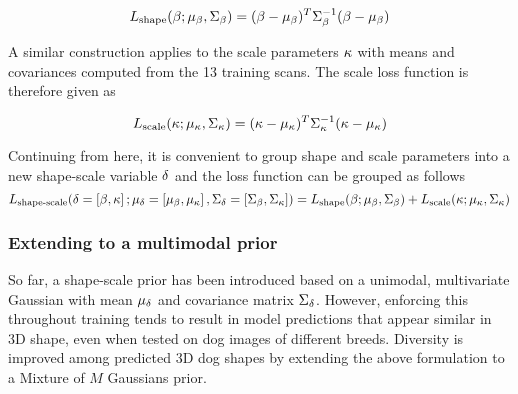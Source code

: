 \begin{equation}
    L_{\textrm{shape}}(\beta;\mu_{\beta},\Sigma_{\beta}) = (\beta - \mu_{\beta})^{T}\Sigma_{\beta}^{-1}(\beta - \mu_{\beta})
\end{equation}

A similar construction applies to the scale parameters $\kappa$ with means and covariances computed from the 13 training scans. The scale loss function is therefore given as

\begin{equation}
    L_{\textrm{scale}}(\kappa;\mu_{\kappa},\Sigma_{\kappa})= (\kappa - \mu_{\kappa})^{T}\Sigma_{\kappa}^{-1}(\kappa - \mu_{\kappa})
\end{equation}

Continuing from here, it is convenient to group shape and scale parameters into a new shape-scale variable $\delta$ and the loss function can be grouped as follows
\begin{equation}
    L_{\textrm{shape-scale}}(\delta=\left[\beta,\kappa\right];\mu_{\delta}=\left[\mu_{\beta},\mu_{\kappa}\right],\Sigma_{\delta}=\left[\Sigma_{\beta},\Sigma_{\kappa}\right]) = L_{\textrm{shape}}(\beta;\mu_{\beta},\Sigma_{\beta}) + L_{\textrm{scale}}(\kappa;\mu_{\kappa},\Sigma_{\kappa})
\end{equation}





\subsubsection{Extending to a multimodal prior}

So far, a shape-scale prior has been introduced based on a unimodal, multivariate Gaussian with mean $\mu_{\delta}$ and covariance matrix $\Sigma_{\delta}$. However, enforcing this throughout training tends to result in model predictions that appear similar in 3D shape, even when tested on dog images of different breeds. Diversity is improved among predicted 3D dog shapes by extending the above formulation to a Mixture of $M$ Gaussians prior.

